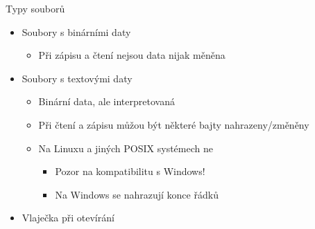 
\begin{frame}{Typy souborů}

  \begin{itemize}
    \item Soubory s binárními daty
    \begin{itemize}
      \item Při zápisu a čtení nejsou data nijak měněna
    \end{itemize}

    \pause

    \item Soubory s textovými daty
    \begin{itemize}
      \item Binární data, ale interpretovaná
      \item Při čtení a zápisu můžou být některé bajty nahrazeny/změněny

      \pause

      \item Na Linuxu a jiných POSIX systémech ne
      \begin{itemize}
	\item Pozor na kompatibilitu s Windows!
	\item Na Windows se nahrazují konce řádků
      \end{itemize}
    \end{itemize}

    \pause

    \item Vlaječka při otevírání
  \end{itemize}

\end{frame}

